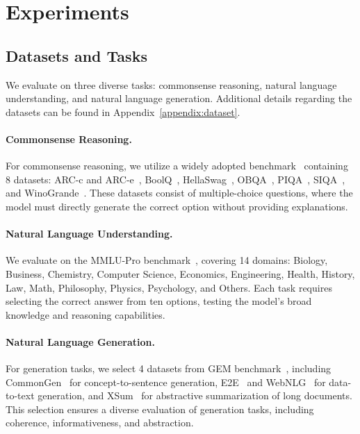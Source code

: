 

\section{Experiments}
\label{sec:exp}

\subsection{Datasets and Tasks}
\label{subsec:data_task}
We evaluate \jola{} on three diverse tasks: commonsense reasoning, natural language understanding, and natural language generation.
Additional details regarding the datasets can be found in Appendix~\ref{appendix:dataset}.

\paragraph{Commonsense Reasoning.}
For commonsense reasoning, we utilize a widely adopted benchmark~\cite{hu-etal-2023-llm,wu2024reft} containing 8 datasets: ARC-c and ARC-e~\cite{clark2018think}, BoolQ~\cite{clark-etal-2019-boolq}, HellaSwag~\cite{zellers-etal-2019-hellaswag}, OBQA~\cite{mihaylov-etal-2018-suit}, PIQA~\cite{bisk2020piqa}, SIQA~\cite{sap-etal-2019-social}, and WinoGrande~\cite{sakaguchi2021winogrande}. 
These datasets consist of multiple-choice questions, where the model must directly generate the correct option without providing explanations. 

\paragraph{Natural Language Understanding.}
We evaluate on the MMLU-Pro benchmark~\cite{wang2024mmlu}, covering 14 domains: Biology, Business, Chemistry, Computer Science, Economics, Engineering, Health, History, Law, Math, Philosophy, Physics, Psychology, and Others. 
Each task requires selecting the correct answer from ten options, testing the model's broad knowledge and reasoning capabilities.

\paragraph{Natural Language Generation.}
For generation tasks, we select 4 datasets from GEM benchmark~\cite{gehrmann-etal-2022-gemv2}, including CommonGen~\cite{lin-etal-2020-commongen} for concept-to-sentence generation, E2E~\cite{novikova-etal-2017-e2e} and WebNLG~\cite{gardent-etal-2017-creating} for data-to-text generation, and XSum~\cite{narayan-etal-2018-dont} for abstractive summarization of long documents. 
This selection ensures a diverse evaluation of generation tasks, including coherence, informativeness, and abstraction.

